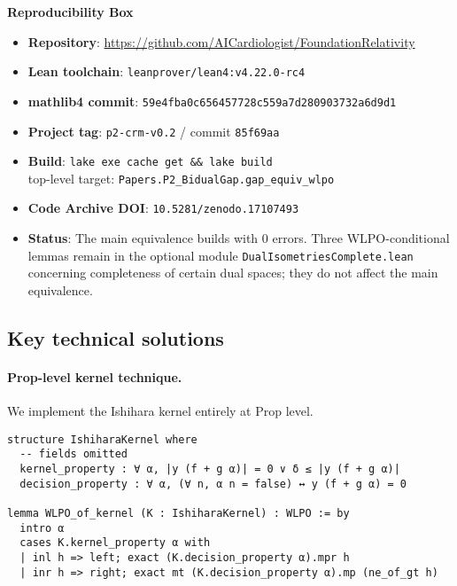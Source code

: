 \documentclass[11pt]{article}
\newcommand{\leanRepo}{\url{https://github.com/AICardiologist/FoundationRelativity}}
\begin{document}
\begin{mdframed}[backgroundcolor=gray!10]
\textbf{Reproducibility Box}
\begin{itemize}
\item \textbf{Repository}: \leanRepo
\item \textbf{Lean toolchain}: \texttt{leanprover/lean4:v4.22.0-rc4}
\item \textbf{mathlib4 commit}: \texttt{59e4fba0c656457728c559a7d280903732a6d9d1}
\item \textbf{Project tag}: \texttt{p2-crm-v0.2} / commit \texttt{85f69aa}
\item \textbf{Build}: \texttt{lake exe cache get \&\& lake build} \\
      top-level target: \texttt{Papers.P2\_BidualGap.gap\_equiv\_wlpo}
\item \textbf{Code Archive DOI}: \texttt{10.5281/zenodo.17107493}
\item \textbf{Status}: The main equivalence builds with 0 errors. Three WLPO-conditional lemmas remain in the optional module \texttt{DualIsometriesComplete.lean} concerning completeness of certain dual spaces; they do not affect the main equivalence.
\end{itemize}
\end{mdframed}

\subsection{Key technical solutions}

\paragraph{Prop-level kernel technique.}
We implement the Ishihara kernel entirely at Prop level.

\begin{lstlisting}[caption={Ishihara kernel (illustrative Lean snippet)}]
structure IshiharaKernel where
  -- fields omitted
  kernel_property : ∀ α, |y (f + g α)| = 0 ∨ δ ≤ |y (f + g α)|
  decision_property : ∀ α, (∀ n, α n = false) ↔ y (f + g α) = 0

lemma WLPO_of_kernel (K : IshiharaKernel) : WLPO := by
  intro α
  cases K.kernel_property α with
  | inl h => left; exact (K.decision_property α).mpr h
  | inr h => right; exact mt (K.decision_property α).mp (ne_of_gt h)
\end{lstlisting}
\end{document}
